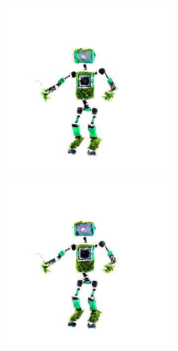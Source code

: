 \begin{figure}[ht]
\begin{subfigure}[b]{0.20\textwidth}
        \includegraphics[width=\textwidth]{figures/appendix/fantasia_refine_robot_5000_part1.png}
        \includegraphics[width=\textwidth]{figures/appendix/fantasia_refine_robot_10000_part1.png}

\end{subfigure}
\end{figure}
